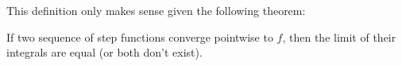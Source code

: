 
This definition only makes sense given the following theorem:

\begin{thm}{}{}
  If two sequence of step functions converge pointwise to \(f\), then the limit of their integrals are equal (or both don't exist).
\end{thm}


